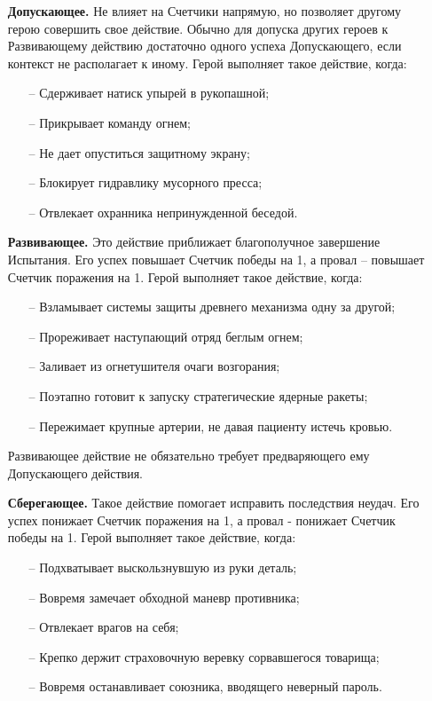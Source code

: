 \begin{itemize}
    \item[]\textbf{Допускающее.} Не влияет на Счетчики напрямую, но позволяет другому герою совершить свое действие. Обычно для допуска других героев к Развивающему действию достаточно одного успеха Допускающего, если контекст не располагает к иному. Герой выполняет такое действие, когда:
    \begin{itemize}
        \item[--] Сдерживает натиск упырей в рукопашной;
        \item[--] Прикрывает команду огнем;
        \item[--] Не дает опуститься защитному экрану;
        \item[--] Блокирует гидравлику мусорного пресса;
        \item[--] Отвлекает охранника непринужденной беседой.
    \end{itemize}
\item[]\textbf{Развивающее.} Это действие приближает благополучное завершение Испытания. Его успех повышает Счетчик победы на 1, а провал – повышает Счетчик поражения на 1. Герой выполняет такое действие, когда:
\begin{itemize}
    \item[--] Взламывает системы защиты древнего механизма одну за другой;
    \item[--] Прореживает наступающий отряд беглым огнем;
    \item[--] Заливает из огнетушителя очаги возгорания;
    \item[--] Поэтапно готовит к запуску стратегические ядерные ракеты;
    \item[--] Пережимает крупные артерии, не давая пациенту истечь кровью.
    \end{itemize}
    \begin{tcolorbox}
        Развивающее действие не обязательно требует предваряющего ему Допускающего действия. \tbd
    \end{tcolorbox}
\item[]\textbf{Сберегающее.} Такое действие помогает исправить последствия неудач. Его успех понижает Счетчик поражения на 1, а провал - понижает Счетчик победы на 1. Герой выполняет такое действие, когда:
\begin{itemize}
    \item[--] Подхватывает выскользнувшую из руки деталь;
    \item[--] Вовремя замечает обходной маневр противника;
    \item[--] Отвлекает врагов на себя;
    \item[--] Крепко держит страховочную веревку сорвавшегося товарища;
    \item[--] Вовремя останавливает союзника, вводящего неверный пароль.
\end{itemize}


\end{itemize}
